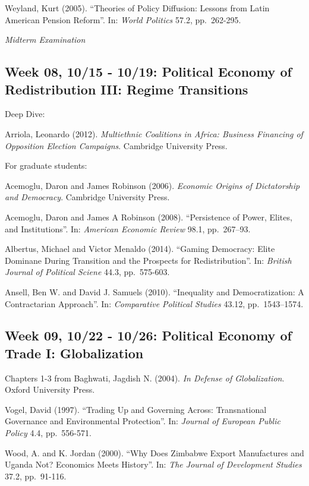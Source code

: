\documentclass[11pt,]{article}
\begin{document}
Weyland, Kurt (2005). ``Theories of Policy Diffusion: Lessons from Latin
American Pension Reform''. In: \emph{World Politics} 57.2, pp.~262-295.

\emph{Midterm Examination}

\subsection{Week 08, 10/15 - 10/19: Political Economy of Redistribution
III: Regime
Transitions}\label{week-08-1015---1019-political-economy-of-redistribution-iii-regime-transitions}

Deep Dive:

Arriola, Leonardo (2012).
\emph{Multiethnic Coalitions in Africa: Business Financing of Opposition Election Campaigns}.
Cambridge University Press.

For graduate students:

Acemoglu, Daron and James Robinson (2006).
\emph{Economic Origins of Dictatorship and Democracy}. Cambridge
University Press.

Acemoglu, Daron and James A Robinson (2008). ``Persistence of Power,
Elites, and Institutions''. In: \emph{American Economic Review} 98.1,
pp.~267--93.

Albertus, Michael and Victor Menaldo (2014). ``Gaming Democracy: Elite
Dominane During Transition and the Prospects for Redistribution''. In:
\emph{British Journal of Political Sciene} 44.3, pp.~575-603.

Ansell, Ben W. and David J. Samuels (2010). ``Inequality and
Democratization: A Contractarian Approach''. In:
\emph{Comparative Political Studies} 43.12, pp.~1543--1574.

\subsection{Week 09, 10/22 - 10/26: Political Economy of Trade I:
Globalization}\label{week-09-1022---1026-political-economy-of-trade-i-globalization}

Chapters 1-3 from Baghwati, Jagdish N. (2004).
\emph{In Defense of Globalization}. Oxford University Press.

Vogel, David (1997). ``Trading Up and Governing Across: Transnational
Governance and Environmental Protection''. In:
\emph{Journal of European Public Policy} 4.4, pp.~556-571.

Wood, A. and K. Jordan (2000). ``Why Does Zimbabwe Export Manufactures
and Uganda Not? Economics Meets History''. In:
\emph{The Journal of Development Studies} 37.2, pp.~91-116.
\end{document}
